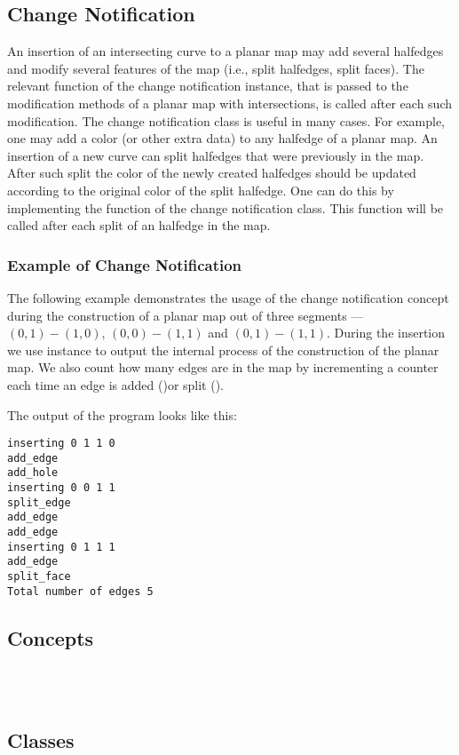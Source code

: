 \begin{ccAdvanced}
\subsection*{Change Notification}
An insertion of an intersecting curve to a planar map may add
several halfedges and modify several features of the map (i.e.,
split halfedges, split faces). The relevant function of the change
notification instance, that is passed to the modification methods
of a planar map with intersections, is called after each such
modification. The change notification class is useful in many
cases. For example, one may add a color (or other extra data) to
any halfedge of a planar map. An insertion of a new curve can
split halfedges that were previously in the map. After such split
the color of the newly created halfedges should be updated
according to the original color of the split halfedge. One can do
this by implementing the  function of the change
notification class. This function will be called after each split
of an halfedge in the map.


\subsubsection{Example of Change Notification}
\label{ssec:example2}
The following example demonstrates the usage of the change
notification concept during the construction of a
planar map out of three segments --- $(0,1)-(1,0)$, $(0,0)-(1,1)$
and $(0,1)-(1,1)$.
During the insertion we use  instance to
output the internal process of the construction of the planar map.
We also count how many edges are in the map by incrementing a
counter each time an edge is added ()or
split ().


The output of the program looks like this:
\begin{verbatim}
inserting 0 1 1 0
add_edge
add_hole
inserting 0 0 1 1
split_edge
add_edge
add_edge
inserting 0 1 1 1
add_edge
split_face
Total number of edges 5
\end{verbatim}

\end{ccAdvanced}



\begin{ccTexOnly}

\subsection*{Concepts}
\\
\\

\subsection*{Classes}


\end{ccTexOnly}
